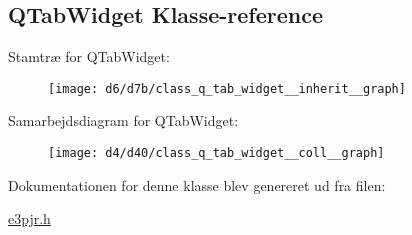 \hypertarget{class_q_tab_widget}{}\subsection{Q\+Tab\+Widget Klasse-\/reference}
\label{class_q_tab_widget}


Stamtræ for Q\+Tab\+Widget\+:
\nopagebreak
\begin{figure}[H]
\begin{center}
\leavevmode
\texttt{[image: d6/d7b/class\_q\_tab\_widget\_\_inherit\_\_graph]}
\end{center}
\end{figure}


Samarbejdsdiagram for Q\+Tab\+Widget\+:
\nopagebreak
\begin{figure}[H]
\begin{center}
\leavevmode
\texttt{[image: d4/d40/class\_q\_tab\_widget\_\_coll\_\_graph]}
\end{center}
\end{figure}


Dokumentationen for denne klasse blev genereret ud fra filen\+:\begin{DoxyCompactItemize}
\item 
\hyperlink{e3pjr_8h}{e3pjr.\+h}\end{DoxyCompactItemize}
